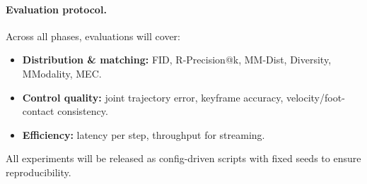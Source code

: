\documentclass[a4paper,12pt]{article}
\begin{document}
\paragraph{Evaluation protocol.}  
Across all phases, evaluations will cover:  
\begin{itemize}
    \item \textbf{Distribution \& matching:} FID, R-Precision@k, MM-Dist, Diversity, MModality, MEC.  
    \item \textbf{Control quality:} joint trajectory error, keyframe accuracy, velocity/foot-contact consistency.  
    \item \textbf{Efficiency:} latency per step, throughput for streaming.  
\end{itemize}



All experiments will be released as config-driven scripts with fixed seeds to ensure reproducibility.


\end{document}
